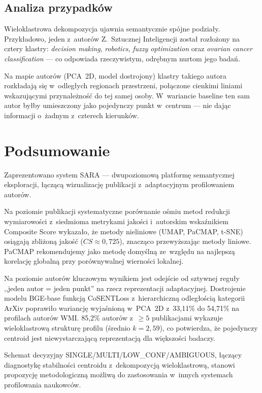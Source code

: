 \documentclass[a4paper,11pt,twocolumn]{article}
\begin{document}
\subsection{Analiza przypadków}

Wieloklastrowa dekompozycja ujawnia semantycznie spójne podziały.
Przykładowo, jeden z~autorów Z.~Sztucznej Inteligencji został
rozłożony na cztery klastry: \emph{decision making}, \emph{robotics},
\emph{fuzzy optimization} oraz \emph{ovarian cancer classification}
--- co odpowiada rzeczywistym, odrębnym nurtom jego badań.

Na mapie autorów (PCA~2D, model dostrojony) klastry takiego autora
rozkładają się w~odległych regionach przestrzeni, połączone cienkimi
liniami wskazującymi przynależność do tej samej osoby. W~wariancie
baseline ten sam autor byłby umieszczony jako pojedynczy punkt
w~centrum --- nie dając informacji o~żadnym z~czterech kierunków.


\section{Podsumowanie}
\label{sec:concl}

Zaprezentowano system SARA --- dwupoziomową platformę semantycznej
eksploracji, łączącą wizualizację publikacji z~adaptacyjnym
profilowaniem autorów.

Na poziomie publikacji systematyczne porównanie ośmiu metod redukcji
wymiarowości z~siedmioma metrykami jakości i~autorskim wskaźnikiem
Composite Score wykazało, że metody nieliniowe (UMAP, PaCMAP, t-SNE)
osiągają zbliżoną jakość ($CS \approx 0{,}725$), znacząco przewyższając
metody liniowe. PaCMAP rekomendujemy jako metodę domyślną ze~względu
na najlepszą korelację globalną przy porównywalnej wierności lokalnej.

Na poziomie autorów kluczowym wynikiem jest odejście od sztywnej reguły
,,jeden autor = jeden punkt'' na rzecz reprezentacji adaptacyjnej.
Dostrojenie modelu BGE-base funkcją CoSENTLoss z~hierarchiczną
odległością kategorii ArXiv poprawiło wariancję wyjaśnioną w~PCA~2D
z~33,11\% do 54,71\% na profilach autorów WMI. 85,2\% autorów
z~$\geq 5$ publikacjami wykazuje wieloklastrową strukturę profilu
(średnio $k=2{,}59$), co potwierdza, że pojedynczy centroid jest
niewystarczającą reprezentacją dla większości badaczy.

Schemat decyzyjny SINGLE/MULTI/LOW\_CONF/AMBIGUOUS, łączący diagnostykę
stabilności centroidu z~dekompozycją wieloklastrową, stanowi propozycję
metodologiczną możliwą do zastosowania w~innych systemach profilowania
naukowców.
\end{document}
